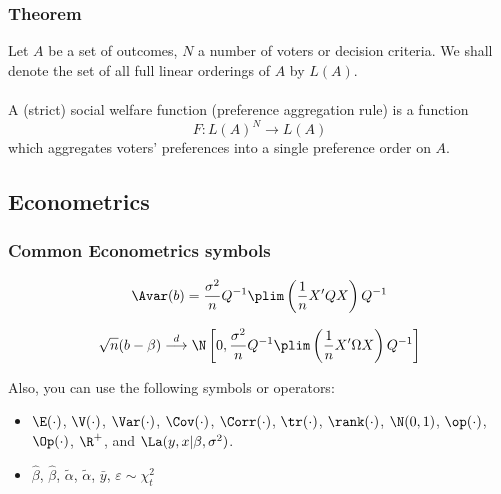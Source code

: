 \documentclass[aspectratio=169]{beamer}
\begin{document}

\begin{frame}
\frametitle{Theorem}
\begin{theorem}
Let $A$ be a set of outcomes, $N$ a number of voters or decision criteria. We shall denote the set of all full linear orderings of $A$ by $L(A)$.\\~\\

A (strict) social welfare function (preference aggregation rule) is a function
\begin{equation}
    F: L(A)^N \longrightarrow L(A)
\end{equation}
which aggregates voters' preferences into a single preference order on $A$.
\end{theorem}
\end{frame}


\subsection{Econometrics}


\begin{frame}
\frametitle{Common Econometrics symbols}

\begin{equation}
    \Avar (b) = \frac{\sigma^2}{n} Q^{-1} \plim \left( \frac{1}{n}X'QX \right)Q^{-1}
\end{equation}

\begin{equation}
    \sqrt{n}(b-\beta) \stackrel{d}{\longrightarrow} \N \left[0,\frac{\sigma^2}{n} Q^{-1} \plim \left( \frac{1}{n}X'\Omega X\right)Q^{-1}\right]
\end{equation}

Also, you can use the following symbols or operators:
\begin{itemize}
    \item $\E(\cdot)$, $\V(\cdot)$, $\Var(\cdot)$, $\Cov(\cdot)$, $\Corr(\cdot)$, $\tr(\cdot)$, $\rank(\cdot)$, $\N(0,1)$, $\op(\cdot)$, $\Op(\cdot)$, $\R^+$, and $\La(y,x|\beta,\sigma^2)$.
    \item $\hat \beta$, $\widehat \beta$, $\tilde \alpha$, $\widetilde \alpha$, $\bar y$, $\varepsilon \sim \chi^2_t$
\end{itemize}

\end{frame}
\end{document}
